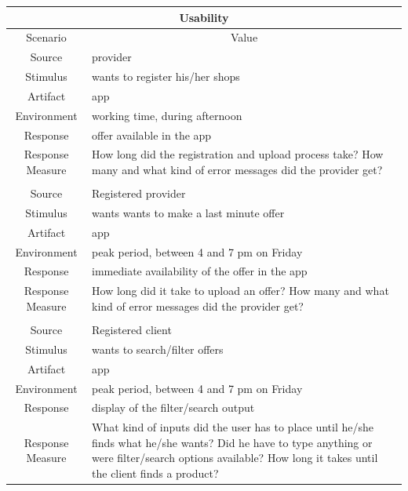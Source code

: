 \begin{table}[H]
    \begin{tabularx}{\textwidth}{|c|X|}
        \hline
        \multicolumn{2}{c}{\textbf{Usability}} \\
        \hline
        \toprule
        \multicolumn{1}{c}{Scenario} & \multicolumn{1}{c}{Value} \\
        \midrule
        Source & \gls{provider} \\
        Stimulus & wants to register his/her shops \\
        Artifact & app \\
        Environment & working time, during afternoon \\
        Response & offer available in the app \\
        Response Measure & How long did the registration and upload process take? How many and what kind of error messages
        did the \gls{provider} get?\\
         & \\
        Source & Registered \gls{provider} \\
        Stimulus & wants wants to make a last minute offer \\
        Artifact & app \\
        Environment & peak period, between 4 and 7 pm on Friday \\
        Response & immediate availability of the offer in the app \\
        Response Measure & How long did it take to upload an offer? How many and what kind of error messages did the 
        \gls{provider} get? \\
        & \\
        Source & Registered \gls{client} \\
        Stimulus & wants to search/filter offers \\
        Artifact & app \\
        Environment & peak period, between 4 and 7 pm on Friday \\
        Response & display of the filter/search output \\
        Response Measure & What kind of inputs did the user has to place until he/she finds what he/she wants?
        Did he have to type anything or were filter/search options available? How long it takes until the client
        finds a product? \\
        \bottomrule
    \end{tabularx}
\end{table}


